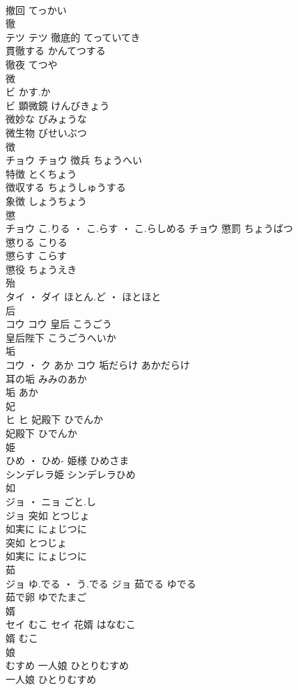 \documentclass[8pt]{extreport}
\begin{document}
\begin{CJK}{UTF8}{min}
\\	撤回	てっかい	
\\	徹	
\\	テツ		テツ	徹底的	てっていてき	
\\	貫徹する	かんてつする	
\\	徹夜	てつや	
\\	微	
\\	ビ	かす.か
\\	ビ	顕微鏡	けんびきょう	
\\	微妙な	びみょうな	
\\	微生物	びせいぶつ	
\\	徴	
\\	チョウ		チョウ	徴兵	ちょうへい	
\\	特徴	とくちょう	
\\	徴収する	ちょうしゅうする	
\\	象徴	しょうちょう	
\\	懲	
\\	チョウ	こ.りる ・ こ.らす ・ こ.らしめる	チョウ	懲罰	ちょうばつ	
\\	懲りる	こりる	
\\	懲らす	こらす	
\\	懲役	ちょうえき	
\\	殆	
\\	タイ ・ ダイ	ほとん.ど ・ ほとほと																																				
\\	后	
\\	コウ		コウ	皇后	こうごう	
\\	皇后陛下	こうごうへいか	
\\	垢	
\\	コウ ・ ク	あか	コウ	垢だらけ	あかだらけ	
\\	耳の垢	みみのあか	
\\	垢	あか	
\\	妃	
\\	ヒ		ヒ	妃殿下	ひでんか	
\\	妃殿下	ひでんか	
\\	姫	
\\	ひめ ・ ひめ-		姫様	ひめさま	
\\	シンデレラ姫	シンデレラひめ	
\\	如	
\\	ジョ ・ ニョ	ごと.し
\\	ジョ	突如	とつじょ	
\\	如実に	にょじつに	
\\	突如	とつじょ	
\\	如実に	にょじつに	
\\	茹	
\\	ジョ	ゆ.でる ・ う.でる	ジョ	茹でる	ゆでる	
\\	茹で卵	ゆでたまご	
\\	婿	
\\	セイ	むこ	セイ	花婿	はなむこ	
\\	婿	むこ	
\\	娘	
\\	むすめ		一人娘	ひとりむすめ	
\\	一人娘	ひとりむすめ	
\end{CJK}
\end{document}
